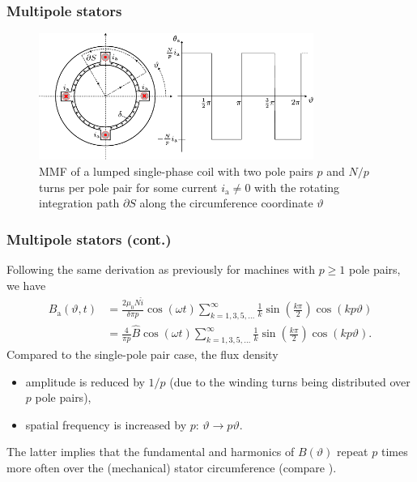 \begin{frame}
	\frametitle{Multipole stators}
        \begin{figure}
                \centering
                \includegraphics[width=0.8\textwidth]{fig/lec05/MMF_single_phase_two_pole_pairs.pdf}
                \caption{MMF of a lumped single-phase coil with two pole pairs $p$ and $N/p$ turns per pole pair for some current $i_\mathrm{a} \neq 0$ with the rotating integration path $\partial S$  along the circumference coordinate $\vartheta$}
                \label{fig: MMF_single_phase_two_pole_pairs}
        \end{figure}
\end{frame}

\begin{frame}
	\frametitle{Multipole stators (cont.)}
        Following the same derivation as previously for machines with $p\geq 1$ pole pairs, we have    \begin{equation}
            \begin{split}
                B_\mathrm{a}(\vartheta, t) &= \frac{2 \mu_0 N \hat{i}}{\delta \pi p}\cos(\omega t)\sum_{k=1,3,5,\ldots}^{\infty}   \frac{1}{k}\sin(\frac{k \pi}{2}) \cos(k p \vartheta)\\ &= \frac{4}{\pi p} \hat{B} \cos(\omega t)\sum_{k=1,3,5,\ldots}^{\infty}   \frac{1}{k}\sin(\frac{k \pi}{2}) \cos(k p \vartheta).
            \end{split}
            \label{eq:B_single_phase_coil_fourier_series_multi_pole}
        \end{equation}
        \pause
        Compared to the single-pole pair case, the flux density 
        \begin{itemize}
            \item<+-> amplitude is reduced by $1/p$ (due to the winding turns being distributed over $p$ pole pairs),
            \item<+-> spatial frequency is increased by $p$: $\vartheta \rightarrow p \vartheta$. 
        \end{itemize}
        \onslide<+->
        The latter implies that the fundamental and harmonics of $B(\vartheta)$ repeat $p$ times more often over the (mechanical) stator circumference (compare ).
\end{frame}

